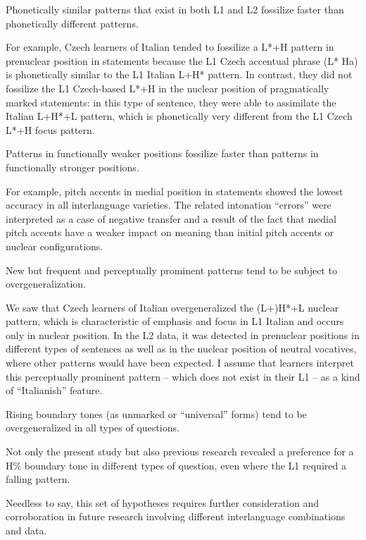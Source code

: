 \ea%
    \label{ex:6}
    Phonetically similar patterns that exist in both L1 and L2 fossilize faster than phonetically different patterns.
    \z

For example, Czech learners of Italian tended to fossilize a L*+H pattern in prenuclear position in statements because the L1 Czech accentual phrase (L* Ha) is phonetically similar to the L1 Italian L+H* pattern. In contrast, they did not fossilize the L1 Czech-based L*+H in the nuclear position of pragmatically marked statements: in this type of sentence, they were able to assimilate the Italian L+H*+L pattern, which is phonetically very different from the L1 Czech L*+H focus pattern.

\ea%
    \label{ex:7}
    Patterns in functionally weaker positions fossilize faster than patterns in functionally stronger positions.
    \z

For example, pitch accents in medial position in statements showed the lowest accuracy in all interlanguage varieties. The related intonation “errors” were interpreted as a case of negative transfer and a result of the fact that medial pitch accents have a weaker impact on meaning than initial pitch accents or nuclear configurations.

\ea%
    \label{ex:8}
    New but frequent and perceptually prominent patterns tend to be subject to overgeneralization.
    \z

We saw that Czech learners of Italian overgeneralized the (L+)H*+L nuclear pattern, which is characteristic of emphasis and focus in L1 Italian and occurs only in nuclear position. In the L2 data, it was detected in prenuclear positions in different types of sentences as well as in the nuclear position of neutral vocatives, where other patterns would have been expected. I assume that learners interpret this perceptually prominent pattern -- which does not exist in their L1 -- as a kind of “Italianish” feature.

\ea%
    \label{ex:9}
    Rising boundary tones (as unmarked or “universal” forms) tend to be overgeneralized in all types of questions.
    \z

Not only the present study but also previous research revealed a preference for a H\% boundary tone in different types of question, even where the L1 required a falling pattern.

Needless to say, this set of hypotheses requires further consideration and corroboration in future research involving different interlanguage combinations and data.

